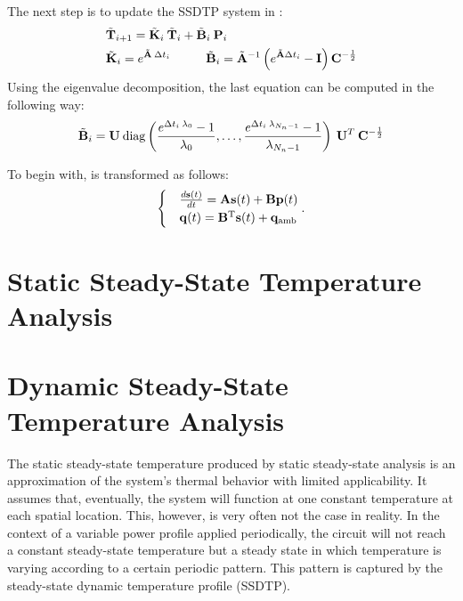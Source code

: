 The next step is to update the SSDTP system in :
\begin{align}
  & \tv{T}_{i+1} = \tm{K}_i \: \tv{T}_i + \tm{B}_i \: \v{P}_i \elab{recurrent-equation} \\
  & \tm{K}_i = e^{\tm{A} \: \Delta t_i} \hspace{10mm} \tm{B}_i = \tm{A}^{-1} \left( e^{\tm{A} \Delta t_i} - \m{I} \right) \m{C}^{-\frac{1}{2}} \nonumber
\end{align}
Using the eigenvalue decomposition, the last equation can be computed in the
following way:
\[
  \tilde{\mathbf{B}}_i = \mathbf{U} \: \mathrm{diag}\left(\frac{e^{\Delta t_i \: \lambda_0} - 1}{\lambda_0}, \dots, \frac{e^{\Delta t_i \: \lambda_{N_n - 1}} - 1}{\lambda_{N_n - 1}}\right) \: \mathbf{U}^T \: \mathbf{C}^{-\frac{1}{2}}
\]

To begin with,  is transformed as follows:
\begin{equation} \elab{temperature-model}
  \begin{cases}
    & \frac{d\vs(t)}{dt} = \m{A} \vs(t) + \m{B} \vp(t) \\
    & \vq(t) = \m{B}^\transpose \vs(t) + \vq_\ambient
  \end{cases}.
\end{equation}

\section{Static Steady-State Temperature Analysis}

\section{Dynamic Steady-State Temperature Analysis}

The static steady-state temperature produced by static steady-state analysis is
an approximation of the system's thermal behavior with limited applicability. It
assumes that, eventually, the system will function at one constant temperature
at each spatial location. This, however, is very often not the case in reality.
In the context of a variable power profile applied periodically, the circuit
will not reach a constant steady-state temperature but a steady state in which
temperature is varying according to a certain periodic pattern. This pattern is
captured by the steady-state dynamic temperature profile (SSDTP).

